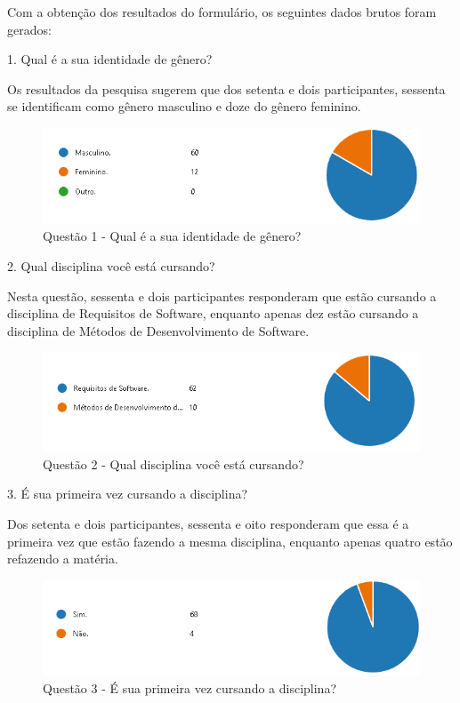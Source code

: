 Com a obtenção dos resultados do formulário, os seguintes dados brutos foram gerados:

1. Qual é a sua identidade de gênero?

Os resultados da pesquisa sugerem que dos setenta e dois participantes, sessenta se identificam como gênero masculino e doze do gênero feminino.

\begin{figure}[H]
\centering
\caption{Questão 1 - Qual é a sua identidade de gênero?}
\includegraphics[scale=0.6]{figuras/1.png}
\end{figure}

2. Qual disciplina você está cursando?

Nesta questão, sessenta e dois participantes responderam que estão cursando a disciplina de Requisitos de Software, enquanto apenas dez estão cursando a disciplina de Métodos de Desenvolvimento de Software.

\begin{figure}[H]
\centering
\caption{Questão 2 - Qual disciplina você está cursando?}
\includegraphics[scale=0.6]{figuras/2.png}
\end{figure}

3. É sua primeira vez cursando a disciplina?

Dos setenta e dois participantes, sessenta e oito responderam que essa é a primeira vez que estão fazendo a mesma disciplina, enquanto apenas quatro estão refazendo a matéria.

\begin{figure}[H]
\centering
\caption{Questão 3 - É sua primeira vez cursando a disciplina?}
\includegraphics[scale=0.5]{figuras/3.png}
\end{figure}

